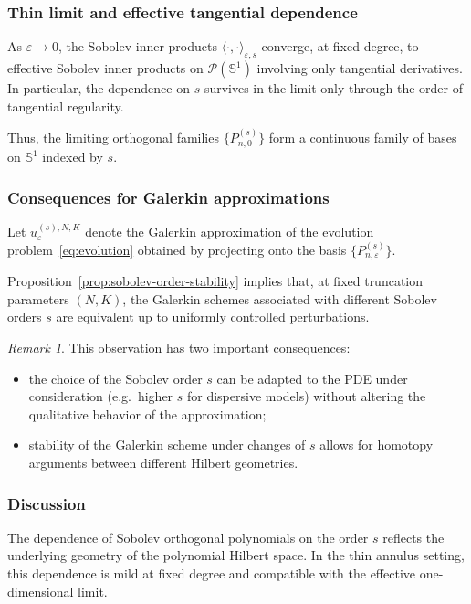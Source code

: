 \documentclass[11pt]{amsart}
\theoremstyle{plain}
\theoremstyle{definition}
\theoremstyle{remark}
\newtheorem{remark}[theorem]{Remark}
\theoremstyle{remark}
\begin{document}
\subsubsection{Thin limit and effective tangential dependence}

As $\varepsilon\to0$, the Sobolev inner products
$\langle\cdot,\cdot\rangle_{\varepsilon,s}$ converge, at fixed degree, to
effective Sobolev inner products on $\mathcal P(\mathbb S^1)$ involving only
tangential derivatives.
In particular, the dependence on $s$ survives in the limit only through
the order of tangential regularity.

Thus, the limiting orthogonal families
$\{P_{n,0}^{(s)}\}$ form a continuous family of bases on $\mathbb S^1$ indexed
by $s$.

\subsubsection{Consequences for Galerkin approximations}

Let $u_\varepsilon^{(s),N,K}$ denote the Galerkin approximation of the evolution
problem~\eqref{eq:evolution} obtained by projecting onto the basis
$\{P_{n,\varepsilon}^{(s)}\}$.

Proposition~\ref{prop:sobolev-order-stability} implies that, at fixed truncation
parameters $(N,K)$, the Galerkin schemes associated with different Sobolev
orders $s$ are equivalent up to uniformly controlled perturbations.

\begin{remark}
This observation has two important consequences:
\begin{itemize}
\item the choice of the Sobolev order $s$ can be adapted to the PDE under
consideration (e.g.\ higher $s$ for dispersive models) without altering the
qualitative behavior of the approximation;
\item stability of the Galerkin scheme under changes of $s$ allows for
homotopy arguments between different Hilbert geometries.
\end{itemize}
\end{remark}

\subsubsection{Discussion}

The dependence of Sobolev orthogonal polynomials on the order $s$ reflects the
underlying geometry of the polynomial Hilbert space.
In the thin annulus setting, this dependence is mild at fixed degree and
compatible with the effective one-dimensional limit.
\end{document}
